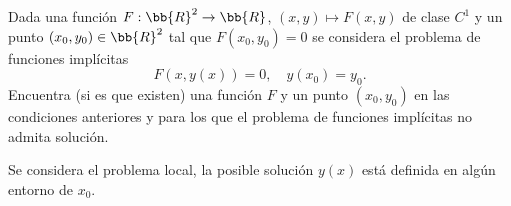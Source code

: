 \documentclass[12pt]{article}
\begin{document}
    \begin{ejercicio}
        Dada una función $F : \bb{R}^2 \to \bb{R}$, $(x, y) \mapsto F(x, y)$ de clase $C^1$ y un punto $(x_0, y_0) \in \bb{R}^2$ tal que $F(x_0, y_0) = 0$ se considera el problema de funciones implícitas
        \begin{equation*}
            F(x, y(x)) = 0, \quad y(x_0) = y_0.
        \end{equation*}
        Encuentra (si es que existen) una función $F$ y un punto $(x_0, y_0)$ en las condiciones anteriores y para los que el problema de funciones implícitas no admita solución.
        \begin{observacion}
            Se considera el problema local, la posible solución $y(x)$ está definida en algún entorno de $x_0$.
        \end{observacion}
    \end{ejercicio}
\end{document}
